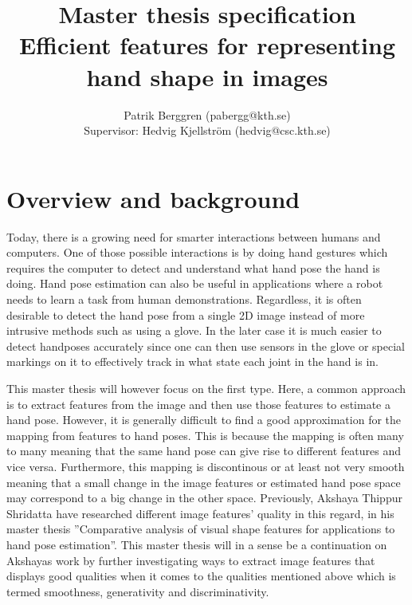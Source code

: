 \documentclass[12pt]{article}
\begin{document}
\newcommand{\B}{\cellcolor{blue!25}}
\newcommand{\BB}{\cellcolor{blue!100}}
\newcommand{\R}{\cellcolor{red!25}}
\newcommand{\RR}{\cellcolor{red!100}}

\title{Master thesis specification \\
       \Large Efficient features for representing hand shape in
images}
\author{Patrik Berggren (pabergg@kth.se) \\
Supervisor: Hedvig Kjellström (hedvig@csc.kth.se)}
\maketitle
\section*{Overview and background}
Today, there is a growing need for smarter interactions between humans and computers.
One of those possible interactions is by doing hand gestures which requires the computer to detect and understand what hand pose the hand is doing.
Hand pose estimation can also be useful in applications where a robot needs to learn a task from human demonstrations.
Regardless, it is often desirable to detect the hand pose from a single 2D image instead of more intrusive methods such as using a glove.
In the later case it is much easier to detect handposes accurately since one can then use sensors in the glove or special markings on it to effectively track in what state each joint in the hand is in.

This master thesis will however focus on the first type.
Here, a common approach is to extract features from the image and then use those features to estimate a hand pose.
However, it is generally difficult to find a good approximation for the mapping from features to hand poses.
This is because the mapping is often many to many meaning that the same hand pose can give rise to different features and vice versa.
Furthermore, this mapping is discontinous or at least not very smooth meaning that a small change in the image features or estimated hand pose space may correspond to a big change in the other space.
Previously, Akshaya Thippur Shridatta have researched different image features' quality in this regard, in his master thesis ''Comparative analysis of visual shape features for applications to hand pose estimation''.
This master thesis will in a sense be a continuation on Akshayas work by further investigating ways to extract image features that displays good qualities when it comes to the qualities mentioned above which is termed smoothness, generativity and discriminativity.
\end{document}

